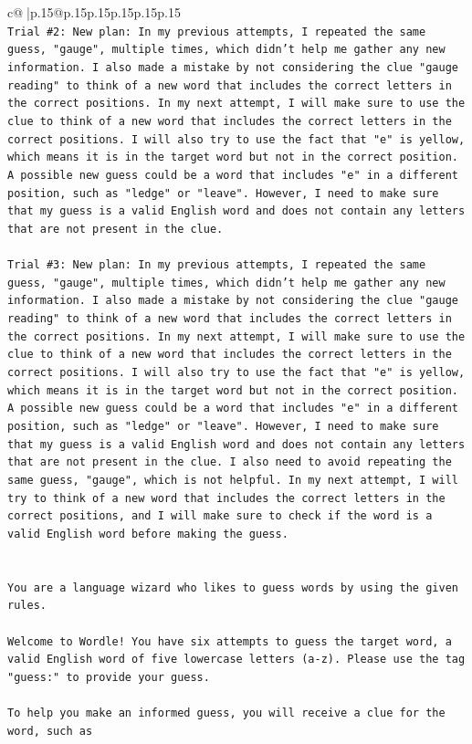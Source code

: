 \documentclass{article}
\begin{document}
{\begin{supertabular}{c@{$\;$}|p{.15\linewidth}@{}p{.15\linewidth}p{.15\linewidth}p{.15\linewidth}p{.15\linewidth}p{.15\linewidth}}
{{{\\ 
\texttt{Trial \#2: New plan: In my previous attempts, I repeated the same guess, "gauge", multiple times, which didn't help me gather any new information. I also made a mistake by not considering the clue "gauge reading" to think of a new word that includes the correct letters in the correct positions. In my next attempt, I will make sure to use the clue to think of a new word that includes the correct letters in the correct positions. I will also try to use the fact that "e" is yellow, which means it is in the target word but not in the correct position. A possible new guess could be a word that includes "e" in a different position, such as "ledge" or "leave". However, I need to make sure that my guess is a valid English word and does not contain any letters that are not present in the clue.} \\
\\ 
\texttt{Trial \#3: New plan: In my previous attempts, I repeated the same guess, "gauge", multiple times, which didn't help me gather any new information. I also made a mistake by not considering the clue "gauge reading" to think of a new word that includes the correct letters in the correct positions. In my next attempt, I will make sure to use the clue to think of a new word that includes the correct letters in the correct positions. I will also try to use the fact that "e" is yellow, which means it is in the target word but not in the correct position. A possible new guess could be a word that includes "e" in a different position, such as "ledge" or "leave". However, I need to make sure that my guess is a valid English word and does not contain any letters that are not present in the clue. I also need to avoid repeating the same guess, "gauge", which is not helpful. In my next attempt, I will try to think of a new word that includes the correct letters in the correct positions, and I will make sure to check if the word is a valid English word before making the guess.} \\
\\ 
\\ 
\texttt{You are a language wizard who likes to guess words by using the given rules.} \\
\\ 
\texttt{Welcome to Wordle! You have six attempts to guess the target word, a valid English word of five lowercase letters (a{-}z). Please use the tag "guess:" to provide your guess.} \\
\\ 
\texttt{To help you make an informed guess, you will receive a clue for the word, such as} \\
}}}
\end{supertabular}}
\end{document}
